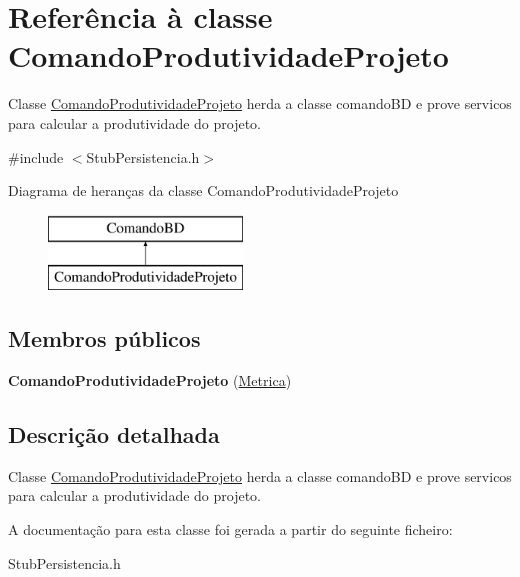 \hypertarget{class_comando_produtividade_projeto}{
\section{\-Referência à classe \-Comando\-Produtividade\-Projeto}
\label{class_comando_produtividade_projeto}
}


\-Classe \hyperlink{class_comando_produtividade_projeto}{\-Comando\-Produtividade\-Projeto} herda a classe comando\-B\-D e prove servicos para calcular a produtividade do projeto.  




{\ttfamily \#include $<$\-Stub\-Persistencia.\-h$>$}

\-Diagrama de heranças da classe \-Comando\-Produtividade\-Projeto\begin{figure}[H]
\begin{center}
\leavevmode
\includegraphics[height=2.000000cm]{class_comando_produtividade_projeto}
\end{center}
\end{figure}
\subsection*{\-Membros públicos}
\begin{DoxyCompactItemize}
\item 
\hypertarget{class_comando_produtividade_projeto_a4657d6ab1a392db3c765f1c172455660}{
{\bfseries \-Comando\-Produtividade\-Projeto} (\hyperlink{class_metrica}{\-Metrica})}
\label{class_comando_produtividade_projeto_a4657d6ab1a392db3c765f1c172455660}

\end{DoxyCompactItemize}


\subsection{\-Descrição detalhada}
\-Classe \hyperlink{class_comando_produtividade_projeto}{\-Comando\-Produtividade\-Projeto} herda a classe comando\-B\-D e prove servicos para calcular a produtividade do projeto. 

\-A documentação para esta classe foi gerada a partir do seguinte ficheiro\-:\begin{DoxyCompactItemize}
\item 
\-Stub\-Persistencia.\-h\end{DoxyCompactItemize}
